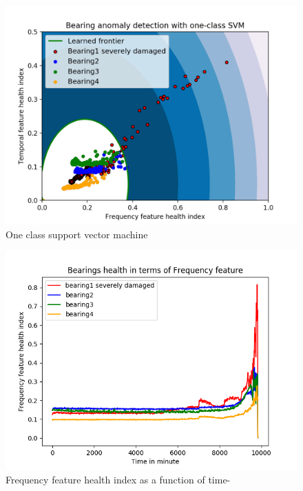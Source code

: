 \documentclass[../Main/thesis.tex]{subfiles}
\begin{document}
\begin{figure}[H] %
   \centering
   \includegraphics[width=5.3in]{../fig/svm.png} 
   \caption{One class support vector machine }
   \label{fig:1svm}
\end{figure}
\begin{figure}[H] %
   \centering
   \includegraphics[width=5.3in]{../fig/frequency_feature_health.png} 
   \caption{Frequency feature health index as a function of time-}
   \label{fig:frequency_feature_health}
\end{figure}
\end{document}

